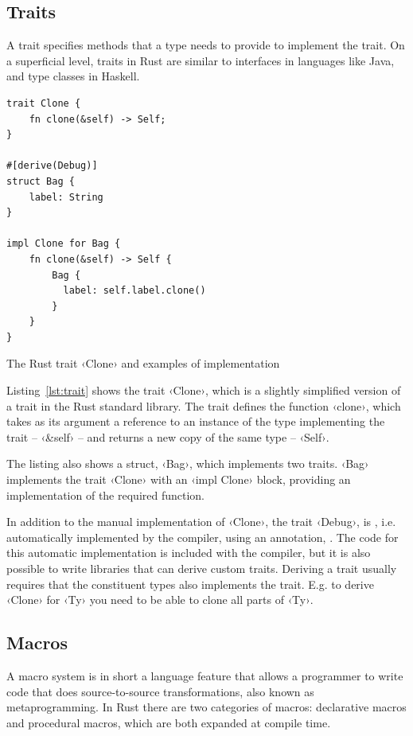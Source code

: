 \subsection{Traits}
\label{sec:traits}

A trait specifies methods that a type needs to provide to implement the trait. On a superficial level, traits in Rust are similar to interfaces in languages like Java, and type classes in Haskell.

\begin{listing}[ht!]
\begin{verbatim}
trait Clone {
    fn clone(&self) -> Self;
}

#[derive(Debug)]
struct Bag {
    label: String
}

impl Clone for Bag {
    fn clone(&self) -> Self {
        Bag {
          label: self.label.clone()
        }
    }
}
\end{verbatim}
\caption{The Rust trait ‹Clone› and examples of implementation}
\label{lst:trait}
\end{listing}

Listing~\ref{lst:trait} shows the trait ‹Clone›, which is a slightly simplified version of a trait in the Rust standard library. The trait defines the function ‹clone›, which takes as its argument a reference to an instance of the type implementing the trait -- ‹&self› -- and returns a new copy of the same type -- ‹Self›.

The listing also shows a struct, ‹Bag›, which implements two traits. ‹Bag› implements the trait ‹Clone› with an ‹impl Clone› block, providing an implementation of the required function.

In addition to the manual implementation of ‹Clone›, the trait ‹Debug›, is , i.e. automatically implemented by the compiler, using an annotation, \mbox{}. The code for this automatic implementation is included with the compiler, but it is also possible to write libraries that can derive custom traits. Deriving a trait usually requires that the constituent types also implements the trait. E.g. to derive ‹Clone› for ‹Ty› you need to be able to clone all parts of ‹Ty›.

\subsection{Macros}
\label{sec:macros}

A macro system is in short a language feature that allows a programmer to write code that does source-to-source transformations, also known as metaprogramming. In Rust there are two categories of macros: declarative macros and procedural macros, which are both expanded at compile time.

